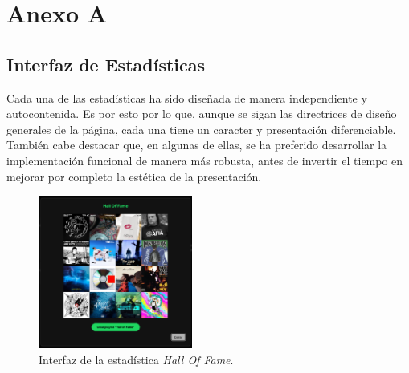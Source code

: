 \chapter*{Anexo A} \label{ch:anexoA}

\section*{Interfaz de Estadísticas}

Cada una de las estadísticas ha sido diseñada de manera independiente y autocontenida. Es por esto por lo que, aunque se sigan las directrices de diseño generales de la página, cada una tiene un caracter y presentación diferenciable. También cabe destacar que, en algunas de ellas, se ha preferido desarrollar la implementación funcional de manera más robusta, antes de invertir el tiempo en mejorar por completo la estética de la presentación.

\begin{figure}[H]
    \centering
    \includegraphics[width=0.45\textwidth]{figures/capturas_ui/hall_of_fame.png}
    \caption{Interfaz de la estadística \textit{Hall Of Fame}.}
    \label{fig:hall_of_fame}
\end{figure}

